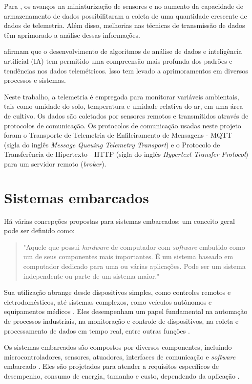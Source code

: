 Para \textcite{Lizhuang_telemetry2021}, os avanços na miniaturização de sensores e no aumento da capacidade de armazenamento de dados possibilitaram a coleta de uma quantidade crescente de dados de telemetria. Além disso, melhorias nas técnicas de transmissão de dados têm aprimorado a análise dessas informações. 

\textcite{Ding_telemetry2017} afirmam que o desenvolvimento de algoritmos de análise de dados e inteligência artificial (IA) tem permitido uma compreensão mais profunda dos padrões e tendências nos dados telemétricos. Isso tem levado a aprimoramentos em diversos processos e sistemas.

Neste trabalho, a telemetria é empregada para monitorar variáveis ambientais, tais como umidade do solo, temperatura e umidade relativa do ar, em uma área de cultivo.  Os dados são coletados por sensores remotos e transmitidos através de protocolos de comunicação. Os protocolos de comunicação usadas neste projeto foram o Transporte de Telemetria de Enfileiramento de Mensagens - MQTT (sigla do inglês \textit{Message Queuing Telemetry Transport}) e o Protocolo de Transferência de Hipertexto - HTTP (sigla do inglês \textit{Hypertext Transfer Protocol}) para um servidor remoto (\textit{broker}).

\section{Sistemas embarcados}
Há várias concepções propostas para sistemas embarcados; um conceito geral pode ser definido como:

\begin{quote}
"Aquele que possui \textit{hardware} de computador com \textit{software} embutido como um de seus componentes mais importantes. É um sistema baseado em computador dedicado para uma ou várias aplicações. Pode ser um sistema independente ou parte de um sistema maior." \parencite[{p. 39}]{dutta2014comprehensive}
\end{quote}

Sua utilização abrange desde dispositivos simples, como controles remotos e eletrodomésticos, até sistemas complexos, como veículos autônomos e equipamentos médicos \parencite{lee2008cyber, kato2018autoware}. Eles desempenham um papel fundamental na automação de processos industriais, na monitoração e controle de dispositivos, na coleta e processamento de dados em tempo real, entre outras funções \parencite{dutta2014comprehensive}.

Os sistemas embarcados são compostos por diversos componentes, incluindo microcontroladores, sensores, atuadores, interfaces de comunicação e \textit{software} embarcado \parencite{lee2008cyber}.
Eles são projetados para atender a requisitos específicos de desempenho, consumo de energia, tamanho e custo, dependendo da aplicação \parencite{Mazid_microcontrolador2011}.

